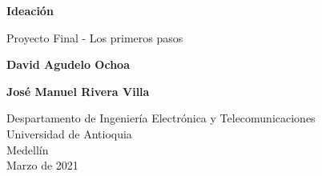 \documentclass{article}
\begin{document}
\begin{titlepage}
    \begin{center}
        \vspace*{1cm}
            
        \Huge
        \textbf{Ideación}
            
        \vspace{0.5cm}
        \LARGE
        Proyecto Final - Los primeros pasos
            
        \vspace{1.5cm}
            
        \textbf{David Agudelo Ochoa}
        
        \vspace{0.5cm}
        
        \textbf{José Manuel Rivera Villa}
            
        \vfill
            
        \vspace{0.8cm}
            
        \Large
        Despartamento de Ingeniería Electrónica y Telecomunicaciones\\
        Universidad de Antioquia\\
        Medellín\\
        Marzo de 2021
            
    \end{center}
\end{titlepage}

\tableofcontents
\newpage
\end{document}
